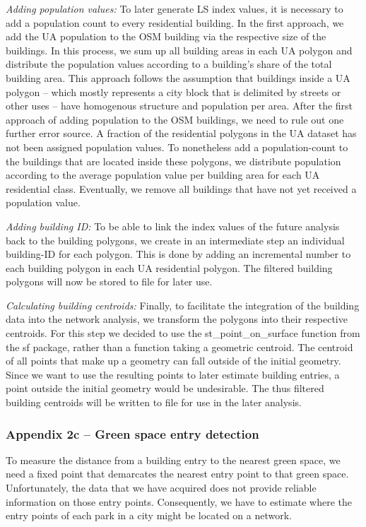 \documentclass[10pt]{article}
\begin{document}
\textit{Adding population values:} To later generate LS index values, it is necessary to add a population count to every residential building. In the first approach, we add the UA population to the OSM building via the respective size of the buildings. In this process, we sum up all building areas in each UA polygon and distribute the population values according to a building’s share of the total building area. This approach follows the assumption that buildings inside a UA polygon – which mostly represents a city block that is delimited by streets or other uses – have homogenous structure and population per area. After the first approach of adding population to the OSM buildings, we need to rule out one further error source. A fraction of the residential polygons in the UA dataset has not been assigned population values. To nonetheless add a population-count to the buildings that are located inside these polygons, we distribute population according to the average population value per building area for each UA residential class. Eventually, we remove all buildings that have not yet received a population value.  

\textit{Adding building ID:} To be able to link the index values of the future analysis back to the building polygons, we create in an intermediate step an individual building-ID for each polygon. This is done by adding an incremental number to each building polygon in each UA residential polygon. The filtered building polygons will now be stored to file for later use. 
 
\textit{Calculating building centroids:} Finally, to facilitate the integration of the building data into the network analysis, we transform the polygons into their respective centroids. For this step we decided to use the st\_point\_on\_surface function from the sf package, rather than a function taking a geometric centroid. The centroid of all points that make up a geometry can fall outside of the initial geometry. Since we want to use the resulting points to later estimate building entries, a point outside the initial geometry would be undesirable. The thus filtered building centroids will be written to file for use in the later analysis.

\subsubsection{Appendix 2c – Green space entry detection}
To measure the distance from a building entry to the nearest green space, we need a fixed point that demarcates the nearest entry point to that green space.
Unfortunately, the data that we have acquired does not provide reliable information on those entry points.
Consequently, we have to estimate where the entry points of each park in a city might be located on a network.
\end{document}
